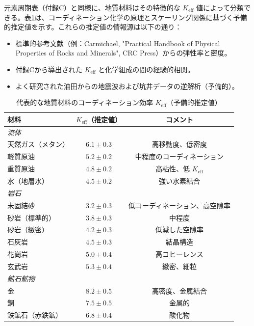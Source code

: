 \documentclass[12pt,a4paper]{article}
\theoremstyle{remark}
\newcommand{\Keff}{K_{\mathrm{eff}}}
\begin{document}
	元素周期表（付録C）と同様に、地質材料はその特徴的な \(\Keff\) 値によって分類できる。表\ref{tab:keff-geology}は、コーディネーション化学の原理とスケーリング関係に基づく予備的推定値を示す。これらの推定値の情報源は以下の通り：
	\begin{itemize}
		\item 標準的参考文献（例：Carmichael, "Practical Handbook of Physical Properties of Rocks and Minerals", CRC Press）からの弾性率と密度。
		\item 付録Cから導出された \(\Keff\) と化学組成の間の経験的相関。
		\item よく研究された油田からの地震波および坑井データの逆解析（予備的）。
	\end{itemize}
	
	\begin{table}[htbp]
		\centering
		\caption{代表的な地質材料のコーディネーション効率 \(\Keff\)（予備的推定値）}
		\label{tab:keff-geology}
		\small
		\begin{tabular}{lcc}
			\toprule
			\textbf{材料} & \textbf{\(\Keff\)（推定値）} & \textbf{コメント} \\
			\midrule
			\multicolumn{3}{l}{\textit{流体}} \\
			天然ガス（メタン） & $6.1 \pm 0.3$ & 高移動度、低密度 \\
			軽質原油 & $5.2 \pm 0.2$ & 中程度のコーディネーション \\
			重質原油 & $4.8 \pm 0.2$ & 高粘性、低 \(\Keff\) \\
			水（地層水） & $4.5 \pm 0.2$ & 強い水素結合 \\
			\hline
			\multicolumn{3}{l}{\textit{岩石}} \\
			未固結砂 & $3.2 \pm 0.3$ & 低コーディネーション、高空隙率 \\
			砂岩（標準的） & $3.8 \pm 0.3$ & 中程度 \\
			砂岩（緻密） & $4.2 \pm 0.3$ & 低減した空隙率 \\
			石灰岩 & $4.5 \pm 0.3$ & 結晶構造 \\
			花崗岩 & $5.0 \pm 0.4$ & 高コヒーレンス \\
			玄武岩 & $5.3 \pm 0.4$ & 緻密、細粒 \\
			\hline
			\multicolumn{3}{l}{\textit{鉱石鉱物}} \\
			金 & $8.2 \pm 0.5$ & 高密度、金属結合 \\
			銅 & $7.5 \pm 0.5$ & 金属的 \\
			鉄鉱石（赤鉄鉱） & $6.8 \pm 0.4$ & 酸化物 \\
			\bottomrule
		\end{tabular}
	\end{table}
	
\end{document}
